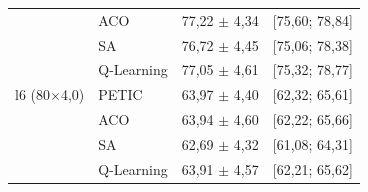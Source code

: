 \begin{table}[htb]
\begin{tabular}{llcc}
         & ACO & 77,22 $\pm$ 4,34 & [75,60; 78,84] \\
         & SA & 76,72 $\pm$ 4,45 & [75,06; 78,38] \\
         & Q-Learning & 77,05 $\pm$ 4,61 & [75,32; 78,77] \\
        \hline
        l6 (80$\times$4,0) & PETIC & 63,97 $\pm$ 4,40 & [62,32; 65,61] \\
         & ACO & 63,94 $\pm$ 4,60 & [62,22; 65,66] \\
         & SA & 62,69 $\pm$ 4,32 & [61,08; 64,31] \\
         & Q-Learning & 63,91 $\pm$ 4,57 & [62,21; 65,62] \\
        \hline
    \end{tabular}
\end{table}
